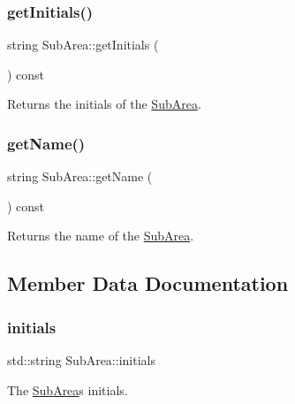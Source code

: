 \subsubsection{\texorpdfstring{get\+Initials()}{getInitials()}}
{\footnotesize\ttfamily string Sub\+Area\+::get\+Initials (\begin{DoxyParamCaption}{ }\end{DoxyParamCaption}) const}



Returns the initials of the \mbox{\hyperlink{classSubArea}{Sub\+Area}}. 

\mbox{\label{classSubArea_a8370d762b413cb20c233cf0ca56315da}} 
\subsubsection{\texorpdfstring{get\+Name()}{getName()}}
{\footnotesize\ttfamily string Sub\+Area\+::get\+Name (\begin{DoxyParamCaption}{ }\end{DoxyParamCaption}) const}



Returns the name of the \mbox{\hyperlink{classSubArea}{Sub\+Area}}. 



\subsection{Member Data Documentation}
\mbox{\label{classSubArea_a3e0a456f5ce325e2a778a17d1929b5d0}} 
\subsubsection{\texorpdfstring{initials}{initials}}
{\footnotesize\ttfamily std\+::string Sub\+Area\+::initials\hspace{0.3cm}{\ttfamily [private]}}



The \mbox{\hyperlink{classSubArea}{Sub\+Area}}\textquotesingle{}s initials. 

\mbox{\label{classSubArea_aa1b0997da15caea7144ae73963da9f82}} 
